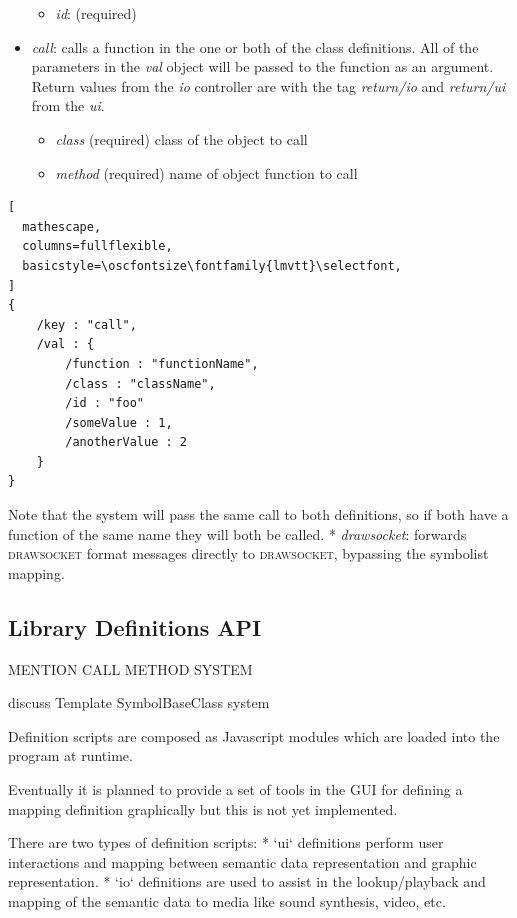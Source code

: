 \documentclass{article}
\def\drawsocket{\textsc{drawsocket}\xspace}
\def\oscfontsize{\footnotesize}
\begin{document}
\begin{itemize}
\begin{itemize}\itemsep0pt 
  \item \textit{id}: (required)
\end{itemize}
\item \textit{call}: calls a function in the one or both of the class definitions. All of the parameters in the \textit{val} object will be passed to the function as an argument. Return values from the \textit{io} controller are with the tag \textit{return/io} and \textit{return/ui} from the \textit{ui}.
\begin{itemize}\itemsep0pt 
  \item \textit{class} (required) class of the object to call
  \item \textit{method} (required) name of object function to call
\end{itemize}

\end{itemize}

\begin{lstlisting}[
  mathescape,
  columns=fullflexible,
  basicstyle=\oscfontsize\fontfamily{lmvtt}\selectfont,
]
{
    /key : "call",
    /val : {
        /function : "functionName",
        /class : "className",
        /id : "foo"
        /someValue : 1,
        /anotherValue : 2
    }
}
\end{lstlisting}

Note that the system will pass the same call to both definitions, so if both have a function of the same name they will both be called.
* \textit{drawsocket}: forwards \drawsocket format messages directly to \drawsocket, bypassing the symbolist mapping.


\subsection{Library Definitions API}\label{subsec:library_definitions_api}

MENTION CALL METHOD SYSTEM	


discuss Template SymbolBaseClass system


Definition scripts are composed as Javascript modules which are loaded into the program at runtime.

Eventually it is planned to provide a set of tools in the GUI for defining a mapping definition graphically but this is not yet implemented.

There are two types of definition scripts:
* `ui` definitions perform user interactions and mapping between semantic data representation and graphic representation.
* `io` definitions are used to assist in the lookup/playback and mapping of the semantic data to media like sound synthesis, video, etc.
\end{document}

